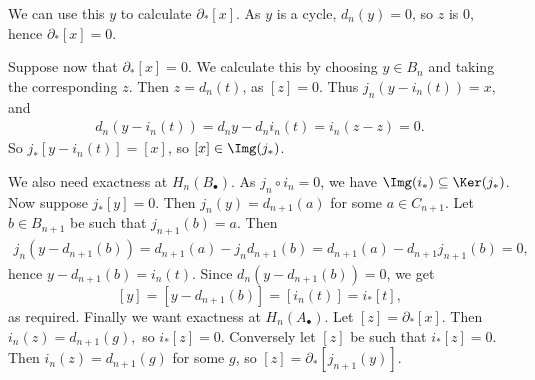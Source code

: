 \documentclass[12pt]{article}
\begin{document}
\begin{proofbox}
	We can use this $y$ to calculate $\partial_\ast[x]$. As $y$ is a cycle, $d_n(y) = 0$, so $z$ is $0$, hence $\partial_\ast[x] = 0$.

	Suppose now that $\partial_\ast[x] = 0$. We calculate this by choosing $y \in B_n$ and taking the corresponding $z$. Then $z = d_n(t)$, as $[z] = 0$. Thus $j_n(y - i_n(t)) = x$, and
	\begin{align*}
		d_n(y - i_n(t)) = d_n y - d_n i_n(t) = i_n(z - z) = 0.
	\end{align*}
	So $j_\ast[y - i_n(t)] = [x]$, so $[x] \in \Img(j_\ast)$.

	We also need exactness at $H_n(B_\bullet)$. As $j_n \circ i_n = 0$, we have $\Img(i_\ast) \subseteq \Ker(j_\ast)$. Now suppose $j_\ast[y] = 0$. Then $j_n(y) = d_{n+1}(a)$ for some $a \in C_{n+1}$. Let $b \in B_{n+1}$ be such that $j_{n+1}(b) = a$. Then
	\begin{align*}
		j_n(y - d_{n+1}(b)) = d_{n+1}(a) - j_n d_{n+1}(b) = d_{n+1}(a) - d_{n+1} j_{n+1}(b) = 0,
	\end{align*}
	hence $y - d_{n+1}(b) = i_n(t)$. Since $d_n(y - d_{n+1}(b)) = 0$, we get
	\[
		[y] = [y - d_{n+1}(b)] = [i_n(t)] = i_\ast[t],
	\]
	as required. Finally we want exactness at $H_n(A_\bullet)$. Let $[z] = \partial_\ast[x]$. Then $i_n(z) = d_{n+1}(g),$ so $i_\ast[z] = 0$. Conversely let $[z]$ be such that $i_\ast[z] = 0$. Then $i_n(z) = d_{n+1}(g)$ for some $g$, so $[z] = \partial_\ast[j_{n+1}(y)]$.
\end{proofbox}


\newpage

\printindex
\end{document}
